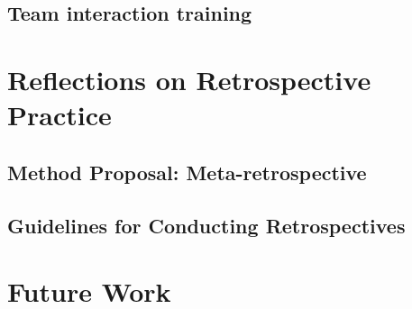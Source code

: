 \subsection{Team interaction training}


\clearpage
\section{Reflections on Retrospective Practice}
\subsection{Method Proposal: Meta-retrospective}

\subsection{Guidelines for Conducting Retrospectives}

\clearpage
\section{Future Work}